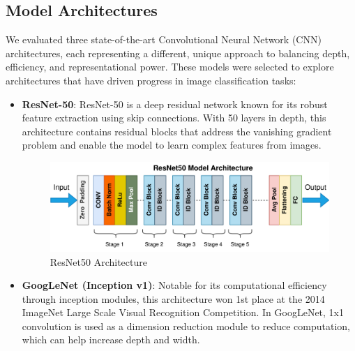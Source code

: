 \documentclass[11pt,twocolumn]{article}
\begin{document}
\subsection{Model Architectures}
We evaluated three state-of-the-art Convolutional Neural Network (CNN) architectures, each representing a different, unique approach to balancing depth, efficiency, and representational power. These models were selected to explore architectures that have driven progress in image classification tasks:
\vspace{0.2cm}
\begin{itemize}
    \item \textbf{ResNet-50}: ResNet-50 is a deep residual network known for its robust feature extraction using skip connections. With 50 layers in depth, this architecture contains residual blocks that address the vanishing gradient problem and enable the model to learn complex features from images.
\begin{figure}[h]
    \centering
    \includegraphics[width=1\linewidth]{report_images/resnet50.png}
    \caption{ResNet50 Architecture}
    \label{fig:dataset}
\end{figure}
    \item \textbf{GoogLeNet (Inception v1)}: Notable for its computational efficiency through inception modules, this architecture won 1st place at the 2014 ImageNet Large Scale Visual Recognition Competition. In GoogLeNet, 1x1 convolution is used as a dimension reduction module to reduce computation, which can help increase depth and width. 


\end{itemize}
\end{document}
